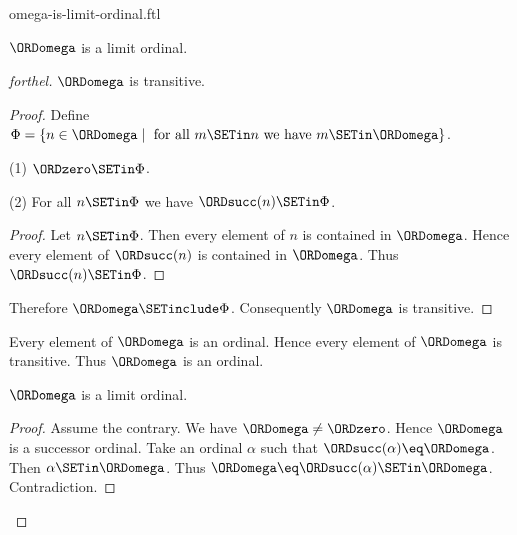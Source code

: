 \documentclass{stex}
\begin{document}
\begin{smodule}{omega-is-limit-ordinal.ftl}

\begin{proposition}[forthel,id=SET_THEORY_03_764451995254784]
  $\ORDomega$ is a limit ordinal.
\end{proposition}
\begin{proof}[forthel]
  $\ORDomega$ is transitive.
  \begin{proof}
    Define $\Phi = \{ n \in \ORDomega \mid\text{ for all }m \SETin n\text{ we have }m \SETin \ORDomega \}$.

    (1) $\ORDzero \SETin \Phi$.

    (2) For all $n \SETin \Phi$ we have $\ORDsucc(n) \SETin \Phi$.
    \begin{proof}
      Let $n \SETin \Phi$.
      Then every element of $n$ is contained in $\ORDomega$.
      Hence every element of $\ORDsucc(n)$ is contained in $\ORDomega$.
      Thus $\ORDsucc(n) \SETin \Phi$.
    \end{proof}

    Therefore $\ORDomega \SETinclude \Phi$.
    Consequently $\ORDomega$ is transitive.
  \end{proof}

  Every element of $\ORDomega$ is an ordinal.
  Hence every element of $\ORDomega$ is transitive.
  Thus $\ORDomega$ is an ordinal.

  $\ORDomega$ is a limit ordinal.
  \begin{proof}
    Assume the contrary.
    We have $\ORDomega \neq \ORDzero$.
    Hence $\ORDomega$ is a successor ordinal.
    Take an ordinal $\alpha$ such that $\ORDsucc(\alpha) \eq \ORDomega$.
    Then $\alpha \SETin \ORDomega$.
    Thus $\ORDomega \eq \ORDsucc(\alpha) \SETin \ORDomega$.
    Contradiction.
  \end{proof}
\end{proof}
\end{smodule}
\end{document}
